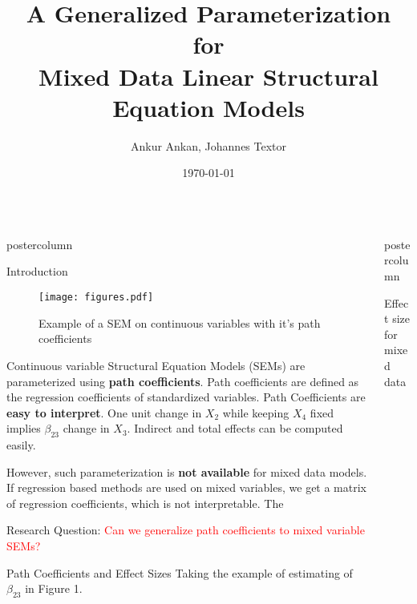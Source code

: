 \documentclass{beamer}
\title{\huge A Generalized Parameterization for \\ Mixed Data Linear Structural Equation Models}
\author{Ankur Ankan, Johannes Textor}
\institute[RU]{Institute for Computing and Information Sciences \\ Radboud University, Netherlands}
\date{\today}
\newlength{\columnheight}
\begin{document}
\begin{frame}
\begin{columns}
	\begin{column}{.33\textwidth}
		\begin{beamercolorbox}[center]{postercolumn}
			\begin{minipage}{.98\textwidth}  %
				\parbox[t][\columnheight]{\textwidth}{ %
	\begin{myblock}{Introduction}
		\begin{figure}
			\texttt{[image: figures.pdf]}
			\label{fig:example_sem}
			\caption{Example of a SEM on continuous variables with it's path coefficients}
		\end{figure}
		
		Continuous variable Structural Equation Models (SEMs) are
		parameterized using \textbf{path coefficients}. Path coefficients
		are defined as the regression coefficients of standardized
		variables. Path Coefficients are \textbf{easy to interpret}. One unit
		change in $ X_2 $ while keeping $ X_4 $ fixed implies $
		\beta_{23} $ change in $ X_3 $. Indirect and total effects can
		be computed easily.

		\vspace{1em}

		However, such parameterization is \textbf{not available} for mixed data
		models. If regression based methods are used on mixed
		variables, we get a matrix of regression coefficients, which is
		not interpretable. The 

		\vspace{1em}

		Research Question: \textcolor{red}{Can we generalize path coefficients to mixed variable SEMs?}
	\end{myblock}\vfill
	\begin{myblock}{Path Coefficients and Effect Sizes}
		Taking the example of estimating of $ \beta_{23} $ in Figure 1.
		
	\end{myblock}\vfill
		}\end{minipage}\end{beamercolorbox}
	\end{column}


	\begin{column}{.33\textwidth}
		\begin{beamercolorbox}[center]{postercolumn}
			\begin{minipage}{.98\textwidth} %
				\parbox[t][\columnheight]{\textwidth}{ %
	\begin{myblock}{Effect size for mixed data}


\end{myblock}}
\end{minipage}
\end{beamercolorbox}
\end{column}
\end{columns}
\end{frame}
\end{document}
